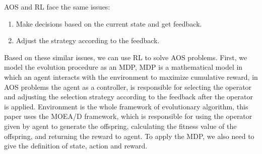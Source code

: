 \documentclass[journal]{IEEEtran}
\begin{document}
AOS and RL face the same issues:
\begin{enumerate}
    \item Make decisions based on the current state and get feedback.
    \item Adjust the strategy according to the feedback.
\end{enumerate}
Based on these similar issues, we can use RL to solve AOS problems.
First, we model the evolution procedure as an MDP,
MDP is a mathematical model in which an agent interacts with the environment to maximize cumulative reward, in AOS problems the agent as a controller, is responsible for selecting the operator and adjusting the selection strategy according to the feedback after the operator is applied.
Environment is the whole framework of evolutionary algorithm, this paper uses the MOEA/D framework, which is responsible for using the operator given by agent to generate the offspring, calculating the fitness value of the offspring, and returning the reward to agent.
To apply the MDP, we also need to give the definition of state, action and reward.
\end{document}
